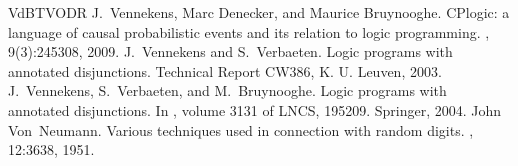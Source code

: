 \documentclass[letterpaper,10pt,english]{sphinxmanual}
\begin{document}
\begin{sphinxthebibliography}{VdBTVODR}
\sphinxAtStartPar
J. Vennekens, Marc Denecker, and Maurice Bruynooghe. CP\sphinxhyphen{}logic: a language of causal probabilistic events and its relation to logic programming. , 9(3):245\textendash{}308, 2009.
\sphinxAtStartPar
J. Vennekens and S. Verbaeten. Logic programs with annotated disjunctions. Technical Report CW386, K. U. Leuven, 2003.
\sphinxAtStartPar
J. Vennekens, S. Verbaeten, and M. Bruynooghe. Logic programs with annotated disjunctions. In , volume 3131 of LNCS, 195\textendash{}209. Springer, 2004.
\sphinxAtStartPar
John Von Neumann. Various techniques used in connection with random digits. , 12:36\textendash{}38, 1951.
\end{sphinxthebibliography}



\renewcommand{\indexname}{Index}
\printindex
\end{document}
